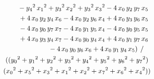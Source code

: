 \documentclass[a4paper,12pt]{book}
\begin{document}
\begin{eqnarray*}
&&\mbox{}-{y_{4}}^{2}\,{x_{1}}^{2}+{y_{3}}^{2}\,{x_{2}}^{2}+{y_{3}}^{2}\,{%
x_{3}}^{2}-4\,{x_{0}}\,{y_{2}}\,{y_{7}}\,{x_{5}} \\
&&\mbox{}+4\,{x_{0}}\,{y_{2}}\,{y_{4}}\,{x_{6}}-4\,{x_{0}}\,{y_{2}}\,{y_{6}}%
\,{x_{4}}+4\,{x_{0}}\,{y_{3}}\,{y_{6}}\,{x_{5}} \\
&&\mbox{}-4\,{x_{0}}\,{y_{0}}\,{y_{7}}\,{x_{7}}-4\,{x_{0}}\,{y_{1}}\,{y_{5}}%
\,{x_{4}}-4\,{x_{0}}\,{y_{0}}\,{y_{5}}\,{x_{5}} \\
&&\mbox{}+4\,{x_{0}}\,{y_{3}}\,{y_{4}}\,{x_{7}}-4\,{x_{0}}\,{y_{0}}\,{y_{4}}%
\,{x_{4}}+4\,{x_{0}}\,{y_{1}}\,{y_{7}}\,{x_{6}} \\
&&\mbox{}-4\,{x_{0}}\,{y_{0}}\,{y_{6}}\,{x_{6}}+4\,{x_{0}}\,{y_{1}}\,{y_{4}}%
\,{x_{5}})\!\;\;/\;\;\;\! \\
&&\mbox{}(({y_{0}}^{2}+{y_{1}}^{2}+{y_{2}}^{2}+{y_{3}}^{2}+{y_{4}}^{2}+{y_{5}%
}^{2}+{y_{6}}^{2}+{y_{7}}^{2}) \\
&&\mbox{}({x_{0}}^{2}+{x_{5}}^{2}+{x_{3}}^{2}+{x_{1}}^{2}+{x_{2}}^{2}+{x_{7}}%
^{2}+{x_{6}}^{2}+{x_{4}}^{2}))\!\!
\end{eqnarray*}
\end{document}
